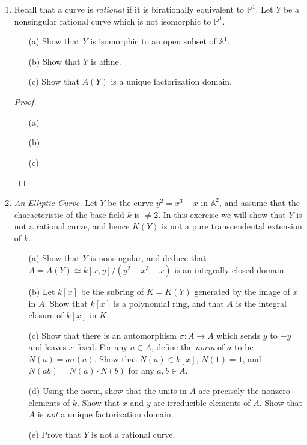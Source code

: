 \documentclass[12pt]{article}
\newcommand{\A}{\mathbb{A}}
\newcommand{\PP}{\mathbb{P}}
\theoremstyle{definition}
\begin{document}
\begin{enumerate} [label=\textbf{\arabic*.}, leftmargin=-0.05em]

\item Recall that a curve is \textit{rational} if it is birationally equivalent to $\PP^1$. Let $Y$ be a nonsingular rational curve which is not isomorphic to $\PP^1$.
\begin{itemize}
    \item[(a)] Show that $Y$ is isomorphic to an open subset of $\A^1$.
    \item[(b)] Show that $Y$ is affine.
    \item[(c)] Show that $A(Y)$ is a unique factorization domain.
\end{itemize}

\begin{proof} $ $ \vspace{0pt}
  \begin{itemize}
    \item[(a)]
    \item[(b)]
    \item[(c)]
  \end{itemize}
\end{proof}

\item \textit{An Elliptic Curve.} Let $Y$ be the curve $y^2 = x^3 - x$ in $\A^2$, and assume that the characteristic of the base field $k$ is $\neq 2$. In this exercise we will show that $Y$ is not a rational curve, and hence $K(Y)$ is not a pure transcendental extension of $k$.
\begin{itemize}
    \item[(a)] Show that $Y$ is nonsingular, and deduce that $A = A(Y) \simeq k[x, y] / (y^2 - x^3 + x)$ is an integrally closed domain.
    \item[(b)] Let $k[x]$ be the subring of $K = K(Y)$ generated by the image of $x$ in $A$. Show that $k[x]$ is a polynomial ring, and that $A$ is the integral closure of $k[x]$ in $K$.
    \item[(c)] Show that there is an automorphism $\sigma : A \to A$ which sends $y$ to $-y$ and leaves $x$ fixed. For any $a \in A$, define the \textit{norm} of $a$ to be $N(a) = a \sigma(a)$. Show that $N(a) \in k[x]$, $N(1) = 1$, and $N(ab) = N(a) \cdot N(b)$ for any $a, b \in A$.
    \item[(d)] Using the norm, show that the units in $A$ are precisely the nonzero elements of $k$. Show that $x$ and $y$ are irreducible elements of $A$. Show that $A$ is \textit{not} a unique factorization domain.
    \item[(e)] Prove that $Y$ is not a rational curve. 
\end{itemize}


\end{enumerate}
\end{document}
